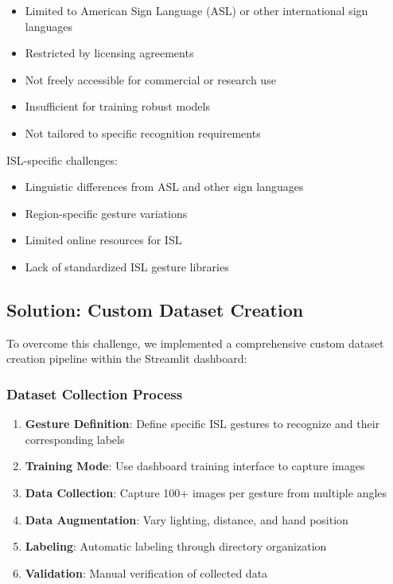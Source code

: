 \begin{itemize}
    \item Limited to American Sign Language (ASL) or other international sign languages
    \item Restricted by licensing agreements
    \item Not freely accessible for commercial or research use
    \item Insufficient for training robust models
    \item Not tailored to specific recognition requirements
\end{itemize}

ISL-specific challenges:
\begin{itemize}
    \item Linguistic differences from ASL and other sign languages
    \item Region-specific gesture variations
    \item Limited online resources for ISL
    \item Lack of standardized ISL gesture libraries
\end{itemize}

\subsection{Solution: Custom Dataset Creation}

To overcome this challenge, we implemented a comprehensive custom dataset creation pipeline within the Streamlit dashboard:

\subsubsection{Dataset Collection Process}

\begin{enumerate}
    \item \textbf{Gesture Definition}: Define specific ISL gestures to recognize and their corresponding labels
    \item \textbf{Training Mode}: Use dashboard training interface to capture images
    \item \textbf{Data Collection}: Capture 100+ images per gesture from multiple angles
    \item \textbf{Data Augmentation}: Vary lighting, distance, and hand position
    \item \textbf{Labeling}: Automatic labeling through directory organization
    \item \textbf{Validation}: Manual verification of collected data
\end{enumerate}


